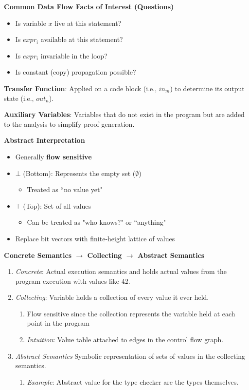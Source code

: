 \documentclass[10pt,twocolumn]{report}
\begin{document}
\textbf{Common Data Flow Facts of Interest (Questions)}
\begin{itemize}
  \item Is variable $x$ live at this statement?
  \item Is $expr_i$ available at this statement?
  \item Is $expr_i$ invariable in the loop?
  \item Is constant (copy) propagation possible?
\end{itemize}

\textbf{Transfer Function}: Applied on a code block (i.e., $in_m$) to determine its output state (i.e., $out_n$).

\textbf{Auxiliary Variables}: Variables that do not exist in the program but are added to the analysis to simplify proof generation.

\textbf{Abstract Interpretation}
\begin{itemize}
  \item Generally \textbf{flow sensitive}
  \item $\bot$ (Bottom): Represents the empty set ($\emptyset$)
  \begin{itemize}
    \item Treated as ``no value yet"
  \end{itemize}
  \item $\top$ (Top): Set of all values
  \begin{itemize}
    \item Can be treated as "who knows?" or ``anything"
  \end{itemize}
  \item Replace bit vectors with finite-height lattice of values
\end{itemize}

\textbf{Concrete Semantics $\rightarrow$ Collecting $\rightarrow$ Abstract Semantics}
\begin{enumerate}
  \item \textit{Concrete}: Actual execution semantics and holds actual values from the program execution with values like 42.
  \item \textit{Collecting}: Variable holds a collection of every value it ever held.
  \begin{enumerate}
    \item Flow sensitive since the collection represents the variable held at each point in the program
    \item \emph{Intuition}: Value table attached to edges in the control flow graph.
  \end{enumerate}
  \item \emph{Abstract Semantics} Symbolic representation of sets of values in the collecting semantics.
  \begin{enumerate}
    \item \emph{Example}: Abstract value for the type checker are the types themselves.
  \end{enumerate}
\end{enumerate}
\end{document}
